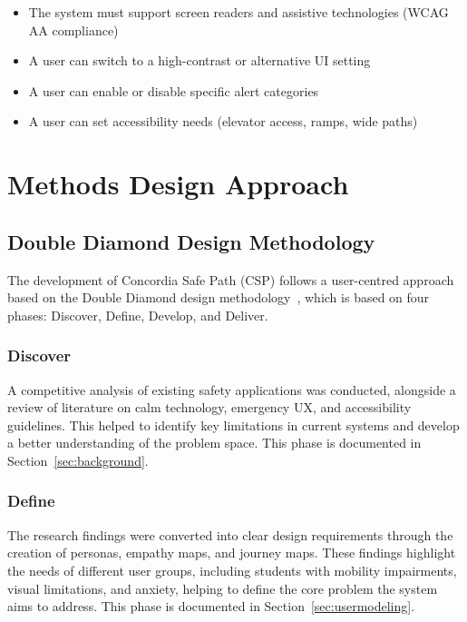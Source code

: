 \documentclass[sigconf]{acmart}
\begin{document}
\begin{itemize}[leftmargin=*, labelindent=0pt, itemsep=2pt]
    \item The system must support screen readers and assistive technologies (WCAG AA compliance)
    \item A user can switch to a high-contrast or alternative UI setting
    \item A user can enable or disable specific alert categories
    \item A user can set accessibility needs (elevator access, ramps, wide paths)
\end{itemize}

\section{Methods Design Approach}
\label{sec:methodology}
 
\subsection{Double Diamond Design Methodology}
 
The development of Concordia Safe Path (CSP) follows a user-centred approach based on the Double Diamond design methodology~\cite{designcouncil2005}, which is based on four phases: Discover, Define, Develop, and Deliver.
 
\subsubsection{Discover}
A competitive analysis of existing safety applications was conducted, alongside a review of literature on calm technology, emergency UX, and accessibility guidelines. This helped to identify key limitations in current systems and develop a better understanding of the problem space. This phase is documented in Section~\ref{sec:background}.
 
\subsubsection{Define}
The research findings were converted into clear design requirements through the creation of personas, empathy maps, and journey maps. These findings highlight the needs of different user groups, including students with mobility impairments, visual limitations, and anxiety, helping to define the core problem the system aims to address. This phase is documented in Section~\ref{sec:usermodeling}.
 
\end{document}
